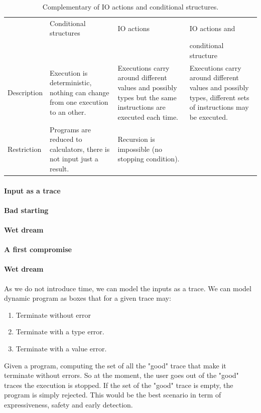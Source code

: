 \documentclass[a4paper]{report}
\begin{document}
\begin{table}
\centering
\begin{tabular}{|p{3.5cm}|p{3.5cm}|p{3.5cm}|p{3.5cm}|}
\hline
&Conditional structures & IO actions & IO actions and\\
& & & conditional structure\\
\hline
Description & Execution is deterministic, nothing can change from one execution to an other. & Executions carry around different values and possibly types but the same instructions are executed each time. & Executions carry around different values and possibly types, different sets of instructions may be executed.\\
\hline
Restriction & Programs are reduced to calculators, there is not input just a result. & Recursion is impossible (no stopping condition). & \\
\hline
\end{tabular}
\caption{Complementary of IO actions and conditional structures.}
\label{comp_if_read}
\end{table}

\paragraph{Input as a trace}

\paragraph{Bad starting}

\paragraph{Wet dream}

\paragraph{A first compromise}

\paragraph{Wet dream} As we do not introduce time, we can model the inputs as a trace. We can model dynamic program as boxes that for a given trace may:
\begin{enumerate}
\item Terminate without error
\item Terminate with a type error.
\item Terminate with a value error.
\end{enumerate}
Given a program, computing the set of all the "good" trace that make it terminate without errors. So at the moment, the user goes out of the "good" traces the execution is stopped. If the set of the "good" trace is empty, the program is simply rejected. This would be the best scenario in term of expressiveness, safety and early detection.
\end{document}
